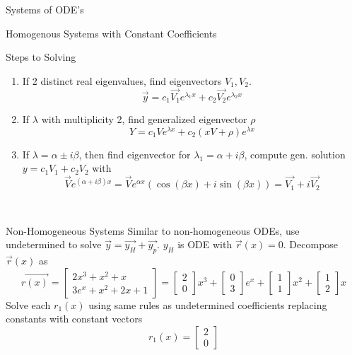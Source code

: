 \documentclass{article}
\begin{document}
\begin{multicols*}{3}
\begin{blackbox}{Systems of ODE's}
{\begin{redbox}{Homogenous Systems with Constant Coefficients}
\begin{brownbox}{Steps to Solving}
\begin{enumerate}[leftmargin=5pt]
                \item If 2 distinct real eigenvalues, find eigenvectors $V_1,V_2$.\\[-5ex]
                \[\vec{y} = c_1\vec{V_1}e^{\lambda_1x} + c_2\vec{V_2}e^{\lambda_2x}\]
                \item If $\lambda$ with multiplicity 2, find generalized eigenvector $\rho$ \\[-4ex]
                \[Y = c_1Ve^{\lambda x} + c_2(xV + \rho)e^{\lambda x}\]                
                \item If $\lambda = \alpha \pm i\beta$, then find eigenvector for $\lambda_1 = \alpha + i\beta$, compute gen. solution $y = c_1V_1 + c_2V_2$ with
                \[\vec{V}e^{(\alpha + i\beta)x} = \vec{V}e^{\alpha x}(\cos(\beta x) + i\sin (\beta x)) = \vec{V_1} + i\vec{V_2}\]
        \end{enumerate}
        \end{brownbox}
    \end{redbox}\\[-2ex]
    \begin{bluebox}{Non-Homogeneous Systems}
        Similar to non-homogeneous ODEs, use undetermined to solve $\vec{y} = \vec{y_H} + \vec{y_p}$. $y_H$ is ODE with $\vec{r}(x) = 0$. Decompose $\vec{r}(x)$ as 
        {\scriptsize
        \[\vec{r(x)} = \begin{bmatrix}
            2 x^3 + x^2 + x \\
            3e^x + x^2 + 2x + 1
        \end{bmatrix} = \begin{bmatrix}
            2\\
            0
        \end{bmatrix}x^3 + \begin{bmatrix}
            0\\
            3
        \end{bmatrix}e^x + \begin{bmatrix}
            1\\
            1
        \end{bmatrix}x^2 + \begin{bmatrix}
            1\\
            2
        \end{bmatrix}x\]
        }
        Solve each $r_1(x)$ using same rules as undetermined coefficients replacing constants with constant vectors
        \[r_1(x) = \begin{bmatrix}
            2\\0

\end{bmatrix}\]
\end{bluebox}}
\end{blackbox}
\end{multicols*}
\end{document}
